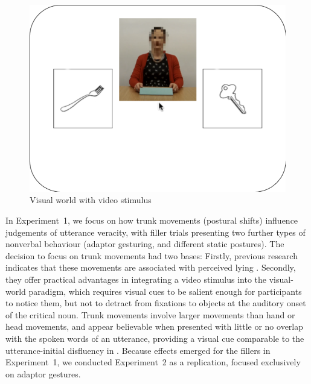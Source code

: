 \documentclass[a4paper,man,natbib]{apa6}
\begin{document}
\begin{figure}[Ht]
  \centering
	\includegraphics[width=\linewidth]{./img/e7_layout.png}
  \caption{Visual world with video stimulus}
  \label{fig:v1_layout}
\end{figure}

In Experiment~1, we focus on how trunk movements (postural shifts) influence judgements of utterance veracity, with filler trials presenting two further types of nonverbal behaviour (adaptor gesturing, and different static postures).
The decision to focus on trunk movements had two bases: Firstly, previous research indicates that these movements are associated with perceived lying \citep{Vrij1996a}.
Secondly, they offer practical advantages in integrating a video stimulus into the visual-world paradigm, which requires visual cues to be salient enough for participants to notice them, but not to detract from fixations to objects at the auditory onset of the critical noun.
Trunk movements involve larger movements than hand or head movements, and appear believable when presented with little or no overlap with the spoken words of an utterance, providing a visual cue comparable to the utterance-initial disfluency in \citet{Loy2017}.
Because effects emerged for the fillers in Experiment~1, we conducted Experiment~2 as a replication, focused exclusively on adaptor gestures.
\end{document}
